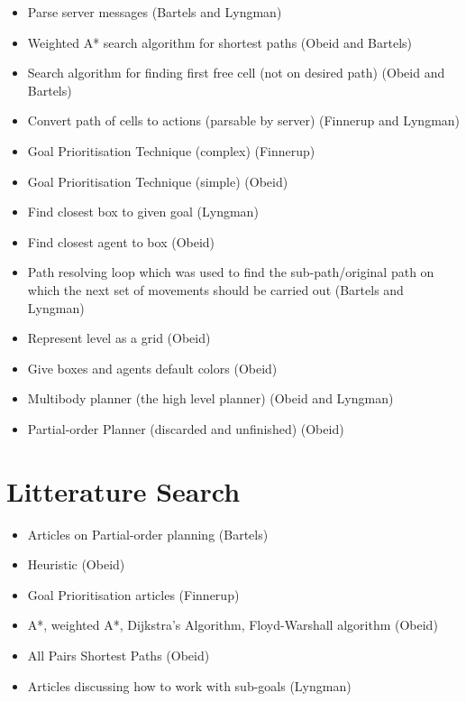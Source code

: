 \documentclass[a4paper]{article}
\newcommand{\jens}{Finnerup}
\newcommand{\sune}{Bartels}
\newcommand{\superdude}{Lyngman}
\newcommand{\elias}{Obeid}
\begin{document}
\begin{itemize}
  \item Parse server messages (\sune{} and \superdude)
  \item Weighted A* search algorithm for shortest paths (\elias{} and \sune)
  \item Search algorithm for finding first free cell (not on desired path) (\elias{} and \sune)
  \item Convert path of cells to actions (parsable by server) (\jens{} and \superdude)
  \item Goal Prioritisation Technique (complex) (\jens)
  \item Goal Prioritisation Technique (simple) (\elias)
  \item Find closest box to given goal (\superdude)
  \item Find closest agent to box (\elias)
  \item Path resolving loop which was used to find the sub-path/original path on which the next set of movements should be carried out (\sune{} and \superdude)
  \item Represent level as a grid (\elias)
  \item Give boxes and agents default colors (\elias)
  \item Multibody planner (the high level planner) (\elias{} and \superdude)
  \item Partial-order Planner (discarded and unfinished) (\elias)
\end{itemize}

\section{Litterature Search}
\begin{itemize}
  \item Articles on Partial-order planning (\sune)
  \item Heuristic (\elias)
  \item Goal Prioritisation articles (\jens)
  \item A*, weighted A*, Dijkstra's Algorithm, Floyd-Warshall algorithm (\elias)
  \item All Pairs Shortest Paths (\elias)
  \item Articles discussing how to work with sub-goals (\superdude)
\end{itemize}
\end{document}
